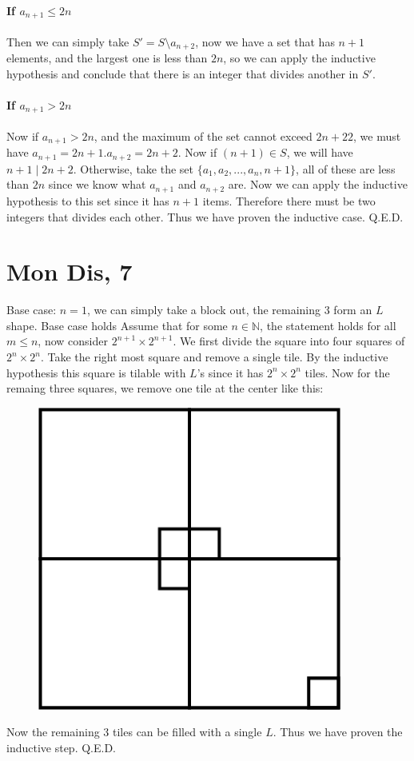 \documentclass[12pt]{article}
\newcommand{\N}{\mathbb{N}}
\begin{document}
\paragraph{If $a_{n+1}\leq 2n$}
Then we can simply take $S' = S \setminus a_{n+2}$, now we have a set that has $n+1$ elements, and the largest one is less than $2n$, so we can apply the inductive hypothesis and conclude that there is an integer that divides another in $S'$.
\paragraph{If $a_{n+1}> 2n$}
Now if $a_{n+1}>2n$, and the maximum of the set cannot exceed $2n+22$, we must have $a_{n+1}=2n+1. a_{n+2}=2n+2$. Now if $(n+1)\in S$, we will have $n+1 \mid 2n+2$. Otherwise, take the set $\{a_1, a_2, ..., a_n, n+1\}$, all of these are less than $2n$ since we know what $a_{n+1}$ and $a_{n+2}$ are. Now we can apply the inductive hypothesis to this set since it has $n+1$ items. Therefore there must be two integers that divides each other.
\newline
Thus we have proven the inductive case. Q.E.D.

\section{Mon Dis, 7}
Base case: $n=1$, we can simply take a block out, the remaining 3 form an $L$ shape. Base case holds
\newline
Assume that for some $n \in \N$, the statement holds for all $m \leq n$, now consider $2^{n+1} \times 2^{n+1}$. We first divide the square into four squares of $2^n \times 2^n$. Take the right most square and remove a single tile. By the inductive hypothesis this square is tilable with $L$'s since it has $2^n \times 2^n$ tiles. Now for the remaing three squares, we remove one tile at the center like this:
\newline
\begin{figure}[H]
    \includegraphics[width = 100mm]{GRAPH2.png}
\end{figure}
Now the remaining 3 tiles can be filled with a single $L$. Thus we have proven the inductive step. Q.E.D.
\end{document}
